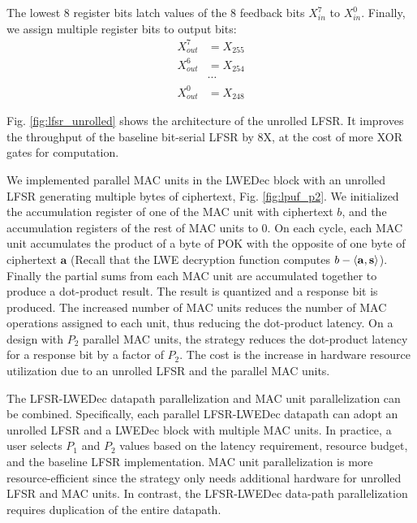 The lowest 8 register bits latch values of the 8 feedback bits $X_{in} ^ 7$ to $X_{in} ^ 0$. Finally, we assign multiple register bits to output bits:
\begin{align*}
    X_{out} ^ 7 &=  X_{255} \\
    X_{out} ^ 6 &=  X_{254}  \\
    &\cdots \\
    X_{out} ^ 0 &= X_{248} 
\end{align*}

Fig. \ref{fig:lfsr_unrolled} shows the architecture of the unrolled LFSR. It improves the throughput of the baseline bit-serial LFSR by 8X, at the cost of more XOR gates for computation.

We implemented parallel MAC units in the LWEDec block with an unrolled LFSR generating multiple bytes of ciphertext, Fig. \ref{fig:lpuf_p2}. 
We initialized the accumulation register of one of the MAC unit with ciphertext $b$, and the accumulation registers of the rest of MAC units to 0. 
On each cycle, each MAC unit accumulates the product of a byte of POK with the opposite of one byte of ciphertext $\mathbf{a}$ 
(Recall that the LWE decryption function computes $b-\langle\mathbf{a},\mathbf{s}\rangle$). 
Finally the partial sums from each MAC unit are accumulated together to produce a dot-product result. The result is quantized and a response bit is produced. The increased number of MAC units reduces the number of MAC operations assigned to each unit, thus reducing the dot-product latency. On a design with $P_2$ parallel MAC units, the strategy reduces the dot-product latency for a response bit by a factor of $P_2$. The cost is the increase in hardware resource utilization due to an unrolled LFSR and the parallel MAC units.

The LFSR-LWEDec datapath parallelization and MAC unit parallelization can be combined. 
Specifically, each parallel LFSR-LWEDec datapath can adopt an unrolled LFSR and a LWEDec block with multiple MAC units. 
In practice, a user selects $P_1$ and $P_2$ values based on the latency requirement, resource budget, and the baseline LFSR implementation. MAC unit parallelization is more resource-efficient since the strategy only needs additional hardware for unrolled LFSR and MAC units. In contrast, the LFSR-LWEDec data-path parallelization requires duplication of the entire datapath. 

